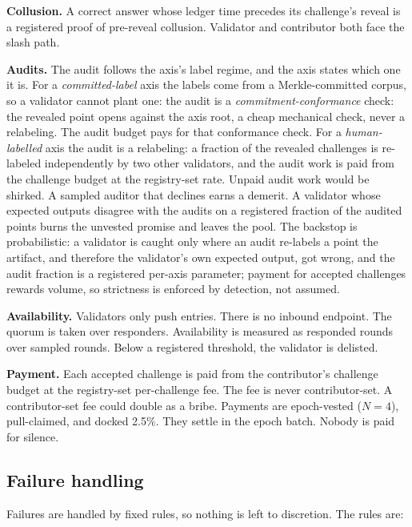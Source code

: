 \documentclass[11pt]{article}
\begin{document}
\textbf{Collusion.} A correct answer whose ledger time precedes
its challenge's reveal is a registered proof of pre-reveal
collusion. Validator and contributor both face the slash path.

\textbf{Audits.} The audit follows the axis's label regime, and the
axis states which one it is. For a \emph{committed-label} axis the
labels come from a Merkle-committed corpus, so a validator cannot
plant one: the audit is a \emph{commitment-conformance} check: the
revealed point opens against the axis root, a cheap mechanical
check, never a relabeling. The audit budget pays for that
conformance check. For a \emph{human-labelled} axis the audit is a
relabeling: a fraction of the revealed challenges is re-labeled
independently by two other validators, and the audit work is paid
from the challenge budget at the registry-set rate. Unpaid audit work
would be shirked. A sampled auditor that declines earns a demerit.
A validator whose expected outputs disagree with the audits on a
registered fraction of the audited points burns the unvested
promise and leaves the pool. The backstop is probabilistic: a
validator is caught only where an audit re-labels a point the
artifact, and therefore the validator's own expected output, got
wrong, and the audit fraction is a registered per-axis parameter;
payment for accepted challenges rewards volume, so strictness is
enforced by detection, not assumed.

\textbf{Availability.} Validators only push entries. There is no
inbound endpoint. The quorum is taken over responders.
Availability is measured as responded rounds over sampled rounds.
Below a registered threshold, the validator is delisted.

\textbf{Payment.} Each accepted challenge is paid from the
contributor's challenge budget at the registry-set per-challenge
fee. The fee is never contributor-set. A contributor-set fee could
double as a bribe. Payments are epoch-vested ($N=4$), pull-claimed,
and docked 2.5\%. They settle in the epoch batch. Nobody is paid
for silence.

\subsection{Failure handling}

Failures are handled by fixed rules, so nothing is left to
discretion. The rules are:
\end{document}
